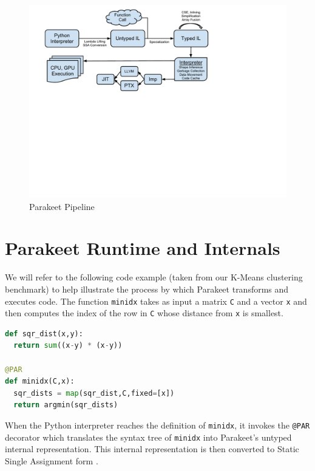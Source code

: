 \documentclass[10pt,twocolumn]{article}
\begin{document}
\begin{figure}[t!bh]
\begin{center}
\leavevmode
\includegraphics[scale=0.6, trim=0pt 310pt 140pt 80pt]{ParakeetNumPyOverview.pdf}
\end{center}
\caption{Parakeet Pipeline}
\label{fig:overview}
\end{figure}

\section{Parakeet Runtime and Internals}
We will refer to the following code example (taken from our K-Means clustering benchmark) to help illustrate the process by which Parakeet transforms and executes code. The function \lstinline{minidx} takes as input a matrix \lstinline{C} and a vector \lstinline{x} and then computes the index of the row in \lstinline{C} whose distance from \lstinline{x} is smallest.

\begin{lstlisting}[language=Python,frame=single, label=MinIdx]
def sqr_dist(x,y):
  return sum((x-y) * (x-y))

@PAR
def minidx(C,x):
  sqr_dists = map(sqr_dist,C,fixed=[x])
  return argmin(sqr_dists)
\end{lstlisting}

When the Python interpreter reaches the definition of \lstinline{minidx}, it invokes the \lstinline{@PAR} decorator which translates the syntax tree of \lstinline{minidx} into Parakeet's untyped internal representation.  This internal representation is then converted to Static Single Assignment form \cite{Cytr91}. 
\end{document}
